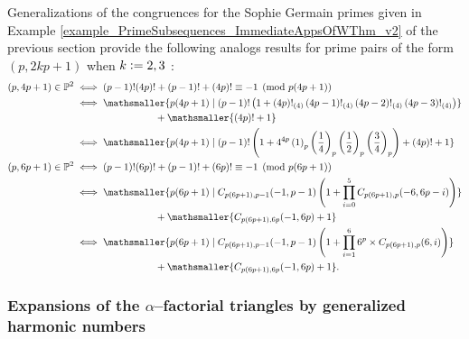 \documentclass[12pt,reqno]{article}
\numberwithin{sfootnote}{section}
\numberwithin{equation}{section}
\theoremstyle{DefaultTheoremStyle}
\theoremstyle{definition}
\newcommand{\defequals}{\ensuremath{\vcentcolon=}}
\newcommand{\Pochhammer}[2]{\ensuremath{\left(#1\right)_{#2}}}
\newcommand{\AlphaFactorial}[2]{\ensuremath{\left(#1\right)!_{\left(#2\right)}}}
\begin{document}
Generalizations of the congruences for the 
Sophie Germain primes given in 
Example \ref{example_PrimeSubsequences_ImmediateAppsOfWThm_v2} 
of the previous section provide the following analogs results for 
prime pairs of the form $(p, 2kp+1)$ when $k \defequals 2, 3$ 
\citep[\S 5.2]{PRIMEREC}: 
\begin{align*} 
\left(p, 4p+1\right) \in \mathbb{P}^{2} 
     & \iff 
     (p-1)! (4p)! + (p-1)! + (4p)! \equiv -1 \pmod{p(4p+1)} \\ 
     & \iff 
     \mathsmaller{ 
     p(4p+1) \mid (p-1)! \left(1 + 
     \AlphaFactorial{4p}{4} \AlphaFactorial{4p-1}{4} 
     \AlphaFactorial{4p-2}{4} \AlphaFactorial{4p-3}{4} 
     \right) 
     } \\ 
     & \phantom{\iff p(4p+1) \mid \quad} + 
     \mathsmaller{ 
     (4p)! + 1 
     } \\ 
     & \iff 
     \mathsmaller{ 
     p(4p+1) \mid (p-1)! \left(1 + 
     4^{4p} \Pochhammer{1}{p} \Pochhammer{\frac{1}{4}}{p} 
     \Pochhammer{\frac{1}{2}}{p} \Pochhammer{\frac{3}{4}}{p} 
     \right) + 
     (4p)! + 1 
     } \\ 
\left(p, 6p+1\right) \in \mathbb{P}^{2} 
     & \iff 
     (p-1)! (6p)! + (p-1)! + (6p)! \equiv -1 \pmod{p(6p+1)} \\ 
     & \iff 
     \mathsmaller{ 
     p(6p+1) \mid C_{p(6p+1),p-1}(-1, p-1) \left(1 + 
     \prod\limits_{i=0}^{5} C_{p(6p+1),p}(-6, 6p-i) \right) 
     } \\ 
     & \phantom{\iff p(6p+1) \mid \quad} + 
     \mathsmaller{ 
     C_{p(6p+1),6p}(-1, 6p) + 1 
     } \\ 
     & \iff 
     \mathsmaller{ 
     p(6p+1) \mid C_{p(6p+1),p-1}(-1, p-1) \left(1 + 
     \prod\limits_{i=1}^{6} 6^{p} \times C_{p(6p+1),p}(6, i) \right) 
     } \\ 
     & \phantom{\iff p(6p+1) \mid \quad} + 
     \mathsmaller{ 
     C_{p(6p+1),6p}(-1, 6p) + 1 
     }. 
\end{align*} 

\subsubsection{Expansions of the $\alpha$--factorial triangles by 
               generalized harmonic numbers} 
\end{document}
